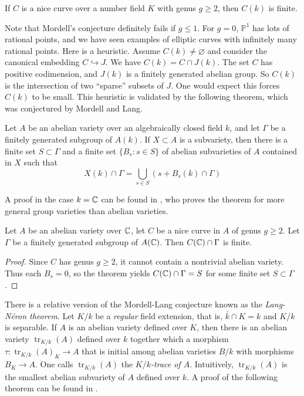 \documentclass{article}
\begin{document}
\begin{theorem}[Faltings]
If $C$ is a nice curve over a number field $K$ with genus $g\geqslant 2$, then 
$C(k)$ is finite.
\end{theorem}

Note that Mordell's conjecture definitely fails if $g\leqslant 1$. For $g=0$, 
$\mathbb{P}^1$ has lots of rational points, and we have seen examples of 
elliptic curves with infinitely many rational points. Here is a heuristic. 
Assume $C(k)\ne\varnothing$ and consider the canonical embedding 
$C\hookrightarrow J$. We have $C(k)=C\cap J(k)$. The set $C$ has positive 
codimension, and $J(k)$ is a finitely generated abelian group. So 
$C(k)$ is the intersection of two ``sparse'' subsets of $J$. One would expect 
this forces $C(k)$ to be small. This heuristic is validated by the following 
theorem, which was conjectured by Mordell and Lang.

\begin{theorem}[Faltings]
Let $A$ be an abelian variety over an algebraically closed field $k$, and let 
$\Gamma$ be a finitely generated subgroup of $A(k)$. If $X\subset A$ is a 
subvariety, then there is a finite set $S\subset \Gamma$ and a finite set 
$\{B_s:s\in S\}$ of abelian subvarieties of $A$ contained in $X$ such that 
\[
  X(k)\cap \Gamma = \bigcup_{s\in S} \left(s+ B_s(k)\cap \Gamma\right)
\]
\end{theorem}
A proof in the case $k=\mathbb{C}$ can be found in \cite{mc95}, who proves the theorem 
for more general group varieties than abelian varieties. 

\begin{corollary}
Let $A$ be an abelian variety over $\mathbb{C}$, let $C$ be a nice curve in $A$ of 
genus $g\geqslant 2$. Let $\Gamma$ be a finitely generated subgroup of 
$A(\mathbb{C})$. Then $C(\mathbb{C})\cap \Gamma$ is finite. 
\end{corollary}
\begin{proof}
Since $C$ has genus $g\geqslant 2$, it cannot contain a nontrivial abelian 
variety. Thus each $B_s = 0$, so the theorem yields $C(\mathbb{C})\cap \Gamma = S$ 
for some finite set $S\subset \Gamma$. 
\end{proof}

There is a relative version of the Mordell-Lang conjecture known as the 
\emph{Lang-N\'eron theorem}. Let $K/k$ be a \emph{regular} field extension, 
that is, $\bar k\cap K = k$ and $K/k$ is separable. If $A$ is an abelian 
variety defined over $K$, then there is an abelian variety 
$\operatorname{tr}_{K/k}(A)$ defined over $k$ together which a morphism 
$\tau:\operatorname{tr}_{K/k}(A)_K\to A$ that is initial among abelian 
varieties $B/k$ with morphisms $B_K\to A$. One calls 
$\operatorname{tr}_{K/k}(A)$ the \emph{$K/k$-trace of $A$}. Intuitively, 
$\operatorname{tr}_{K/k}(A)$ is the smallest abelian subvariety of $A$ defined 
over $k$. A proof of the following theorem can be found in \cite{co06}. 
\end{document}
